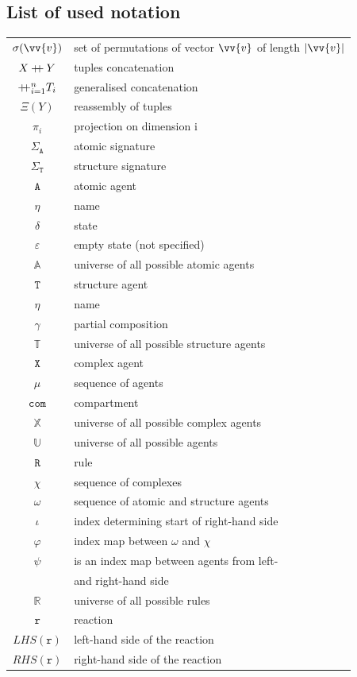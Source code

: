 \documentclass[12pt, twoside]{fithesis2} %
\newcommand\mdoubleplus{\mathbin{+\mkern-7mu+}}
\begin{document}
\begin{appendices}

\chapter{List of used notation}

\begin{center}
\begin{tabular}{c | l}
$\sigma(\vv{v})$ & set of permutations of vector $\vv{v}$ of length $|\vv{v}|$\\
$X \mdoubleplus Y$ & tuples concatenation\\
$\mdoubleplus_{i=1}^n T_i$ & generalised concatenation\\
$\Xi(Y)$ & reassembly of tuples\\
$\pi_i$ & projection on dimension i\\
\hline 
$\Sigma_{\mathtt{A}}$ & atomic signature \\
$\Sigma_{\mathtt{T}}$ & structure signature \\
\hline 
$\mathtt{A}$ & atomic agent \\
$\eta$ & name \\
$\delta$ & state \\
$\varepsilon$ & empty state (not specified)\\
$\mathds{A}$ & universe of all possible atomic agents \\
\hline 
$\mathtt{T}$ & structure agent \\
$\eta$ & name \\
$\gamma$ & partial composition\\
$\mathds{T}$ & universe of all possible structure agents\\
\hline 
$\mathtt{X}$ & complex agent\\
$\mu$ & sequence of agents\\
$\mathtt{com}$ & compartment\\
$\mathds{X}$ & universe of all possible complex agents\\
$\mathds{U}$ & universe of all possible agents\\
\hline 
$\mathtt{R}$ & rule\\
$\chi$ & sequence of complexes\\
$\omega$ & sequence of atomic and structure agents\\
$\iota$ & index determining start of right-hand side\\
$\varphi$ & index map between $\omega$ and $\chi$\\
$\psi$ & is an index map between agents from left-\\
 & and right-hand side\\
$\mathds{R}$ & universe of all possible rules\\
\hline 
$\mathtt{r}$ & reaction\\
$LHS(\mathtt{r})$ & left-hand side of the reaction\\
$RHS(\mathtt{r})$ & right-hand side of the reaction\\
\end{tabular}
\end{center}


\end{appendices}
\end{document}
